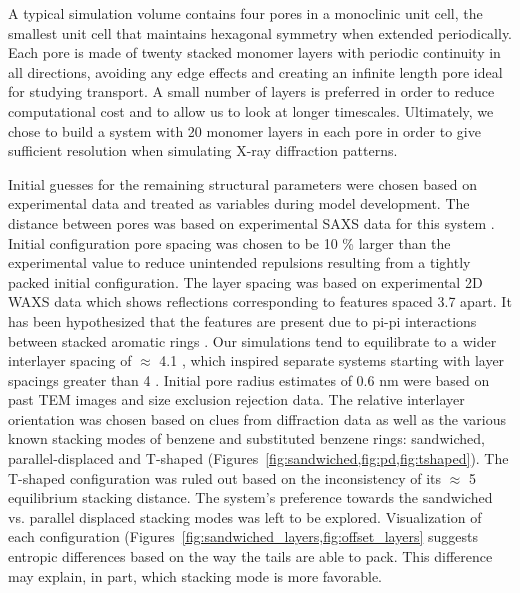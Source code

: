 A typical simulation volume contains four pores in a monoclinic unit cell,
the smallest unit cell that maintains hexagonal symmetry when extended 
periodically. Each pore is made of twenty stacked monomer layers with
periodic continuity in all directions, avoiding any edge effects and 
creating an infinite length pore ideal for studying transport. A small
number of layers is preferred in order to reduce computational cost and 
to allow us to look at longer timescales. Ultimately, we chose to build a system
with 20 monomer layers in each pore in order to give sufficient
resolution when simulating X-ray diffraction patterns.  %


Initial guesses for the remaining structural parameters were chosen
based on experimental data and treated as variables during model
development. The distance between pores was based on experimental SAXS
data for this system \cite{feng_thin_2016}. Initial configuration pore
spacing was chosen to be 10 \% larger than the experimental value to reduce
unintended repulsions resulting from a tightly packed initial configuration. 
The layer spacing was based on experimental 2D WAXS data which shows
reflections corresponding to features spaced 3.7 \angstrom apart. It has 
been hypothesized that the features are present due to pi-pi
interactions between stacked aromatic rings \cite{feng_scalable_2014}. 
Our simulations tend to equilibrate to a wider interlayer spacing of $\approx$ 4.1 \angstrom,
which inspired separate systems starting with layer spacings greater than
 4 \angstrom. Initial pore radius estimates of 0.6 nm were based on past TEM 
images and size exclusion rejection data\cite{feng_scalable_2014,
feng_thin_2016,zhou_supported_2005}.
The relative interlayer orientation was chosen based on clues from diffraction
data as well as the various known stacking modes of benzene and substituted 
benzene rings: sandwiched, parallel-displaced and T-shaped 
(Figures~\ref{fig:sandwiched,fig:pd,fig:tshaped}). The T-shaped 
configuration was ruled out based on the inconsistency of its $\approx$ 
5 \angstrom equilibrium stacking distance. The system's preference
towards the sandwiched vs. parallel displaced stacking modes was left
to be explored. Visualization of each configuration 
(Figures~\ref{fig:sandwiched_layers,fig:offset_layers} suggests 
entropic differences based on the way the tails are able to pack. 
This difference may explain, in part, which stacking mode is more favorable.

